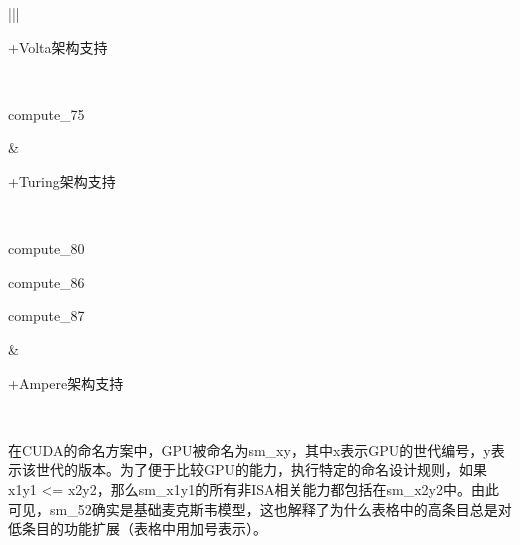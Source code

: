 \documentclass[a4paper,12pt,english]{sphinxmanual}
\begin{document}
\begin{savenotes}
\begin{tabular}[t]{|*{2}{|}}
\begin{DUlineblock}{0em}
\item[] +Volta架构支持
\item[] 
\end{DUlineblock}
\\
\sphinxhline
\begin{DUlineblock}{0em}
\item[] compute\_75
\end{DUlineblock}
&
\begin{DUlineblock}{0em}
\item[] +Turing架构支持
\end{DUlineblock}
\\
\sphinxhline
\begin{DUlineblock}{0em}
\item[] compute\_80
\item[] compute\_86
\item[] compute\_87
\end{DUlineblock}
&
\begin{DUlineblock}{0em}
\item[] 
\item[] +Ampere架构支持
\item[] 
\end{DUlineblock}
\\
\sphinxbottomrule
\end{tabular}
\sphinxtableafterendhook\par
\sphinxattableend\end{savenotes}

\sphinxAtStartPar
在CUDA的命名方案中，GPU被命名为sm\_xy，其中x表示GPU的世代编号，y表示该世代的版本。为了便于比较GPU的能力，执行特定的命名设计规则，如果x1y1 <= x2y2，那么sm\_x1y1的所有非ISA相关能力都包括在sm\_x2y2中。由此可见，sm\_52确实是基础麦克斯韦模型，这也解释了为什么表格中的高条目总是对低条目的功能扩展（表格中用加号表示）。
\end{document}

